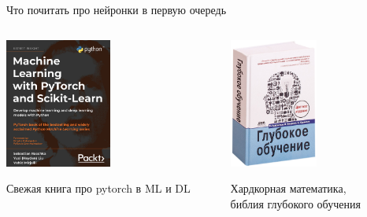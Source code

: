 \documentclass[notes,12pt, aspectratio=169]{beamer}
\begin{document}
\begin{frame}{Что почитать про нейронки в первую очередь}
\begin{columns}
	\begin{column}{0.5\textwidth}
		\begin{center}
			\includegraphics[width=0.5\textwidth]{rashka.png}
			
	\footnotesize Свежая книга про pytorch в ML и DL
		\end{center}
	\end{column}
	\begin{column}{0.5\textwidth}
		\begin{center}
			\includegraphics[width=0.5\textwidth]{book4.jpg}
			
	\footnotesize Хардкорная математика, \\ библия глубокого обучения
		\end{center}
	\end{column}
\end{columns}
\end{frame} 
\end{document}
